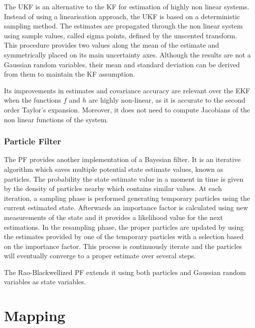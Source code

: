 \noindent The \gls{UKF} is an alternative to the \gls{KF} for estimation of highly non linear systems\cite{unscentedK}.
Instead of using a linearisation approach, the \gls{UKF} is based on a deterministic sampling method.
The estimates are propagated through the non linear system using sample values, called sigma points, defined by the unscented transform.
This procedure provides two values along the mean of the estimate and symmetrically placed on its main uncertainty axes.
Although the results are not a Gaussian random variables, their mean and standard deviation can be derived from them to maintain the \gls{KF} assumption.

Its improvements in estimates and covariance accuracy are relevant over the \gls{EKF} when the functions $f$ and $h$ are highly non-linear, as it is accurate to the second order Taylor's expansion.
Moreover, it does not need to compute Jacobians of the non linear functions of the system\cite{thrun_probabilistic_2005}.



\subsubsection{Particle Filter}

\noindent The \gls{PF} provides another implementation of a Bayesian filter\cite{particle}.
It is an iterative algorithm which saves multiple potential state estimate values, known as particles.
The probability the state estimate value in a moment in time is given by the density of particles nearby which contains similar values.
At each iteration, a sampling phase is performed generating temporary particles using the current estimated state.
Afterwards an importance factor is calculated using new measurements of the state and it provides a likelihood value for the next estimations.
In the resampling phase, the proper particles are updated by using the estimates provided by one of the temporary particles with a selection based on the importance factor.
This process is continuously iterate and the particles will eventually converge to a proper estimate over several steps.

The Rao-Blackwellized \gls{PF} extends it using both particles and Gaussian random variables as state variables\cite{murphy_rao-blackwellised_2001}.

\section{Mapping}

